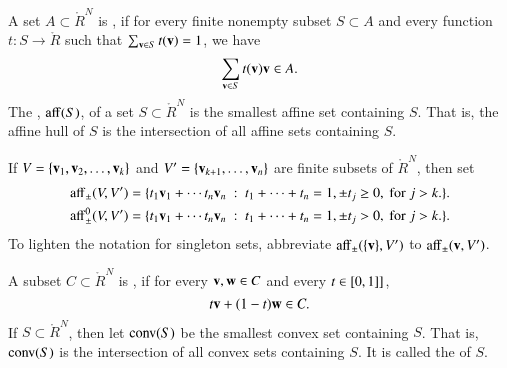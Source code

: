 \begin{definition}
A set $A\subset\ring{R}^N$ is , if for
every finite nonempty subset $S\subset A$ and every function $t:S\to\ring{R}$ such that $\sum _{{\mathbf v}\in S} t({\mathbf v})=1$, we have
\begin{displaymath}
 \sum_{\v\in S} t(\v) \v \in A.  %
\end{displaymath}
The , ${\operatorname{aff}}(S)$, of a set $S\subset\ring{R}^N$ is the smallest affine set
containing $S$. 
That is, the affine hull of $S$ is the intersection of all affine
sets containing $S$. 
\end{definition}


\begin{definition}[affine]\label{def:aff} 
  If $V = \{{\mathbf v}_1,{\mathbf v}_2,\ldots,{\mathbf v}_k\}$ and $V'=\{{\mathbf v}_{k+1},\ldots,{\mathbf v}_n\}$
  are finite subsets of $\ring{R}^N$, then set
	\begin{eqnarray*}%
\op{aff}_{\pm} (V,V') &= \{t_1 \v_1 +\cdots t_n \v_n \mid
	t_1 +\cdots+t_n = 1, \pm t_j \ge 0, \text{ for } j>k.\}.\\
\op{aff}^0_{\pm} (V,V') &= \{t_1 \v_1 +\cdots t_n \v_n \mid
	t_1 +\cdots+t_n = 1, \pm t_j > 0, \text{ for } j>k.\}.
		\end{eqnarray*}
To lighten the notation for singleton sets, abbreviate
${\operatorname{aff}}_\pm(\{{\mathbf v}\},V')$ to ${\operatorname{aff}}_\pm({\mathbf v},V')$.
%
%
%
%
%
\end{definition}



\begin{definition} 
A subset $C\subset\ring{R}^N$ is , if for
every ${\mathbf v},{\mathbf w}\in C$ and every $t \in [0,1]]$,
\begin{displaymath}
t {\mathbf v} + (1-t) {\mathbf w} \in C.
\end{displaymath}
If $S\subset\ring{R}^N$, then let ${\operatorname{conv}}(S)$ be the smallest convex set
containing $S$.  That is, ${\operatorname{conv}}(S)$ is the intersection of all convex
sets containing $S$.  It is called the  of $S$.
\end{definition}

